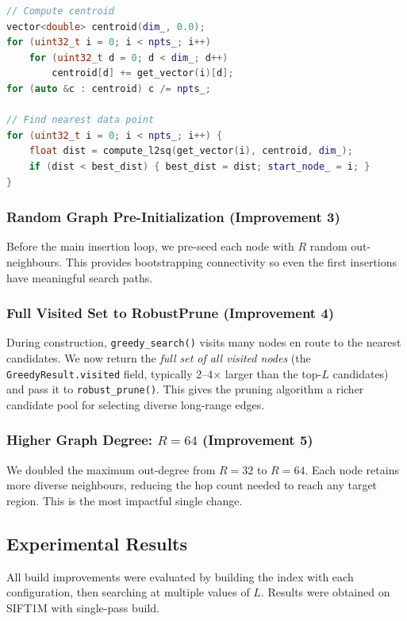 \documentclass[10pt]{article}
\begin{document}
\begin{lstlisting}[language=C++, caption={Medoid computation (simplified).}]
// Compute centroid
vector<double> centroid(dim_, 0.0);
for (uint32_t i = 0; i < npts_; i++)
    for (uint32_t d = 0; d < dim_; d++)
        centroid[d] += get_vector(i)[d];
for (auto &c : centroid) c /= npts_;

// Find nearest data point
for (uint32_t i = 0; i < npts_; i++) {
    float dist = compute_l2sq(get_vector(i), centroid, dim_);
    if (dist < best_dist) { best_dist = dist; start_node_ = i; }
}
\end{lstlisting}

\subsubsection{Random Graph Pre-Initialization (Improvement 3)}
Before the main insertion loop, we pre-seed each node with $R$ random out-neighbours. This provides bootstrapping connectivity so even the first insertions have meaningful search paths.

\subsubsection{Full Visited Set to RobustPrune (Improvement 4)}
During construction, \texttt{greedy\_search()} visits many nodes en route to the nearest candidates. We now return the \emph{full set of all visited nodes} (the \texttt{GreedyResult.visited} field, typically 2--4$\times$ larger than the top-$L$ candidates) and pass it to \texttt{robust\_prune()}. This gives the pruning algorithm a richer candidate pool for selecting diverse long-range edges.

\subsubsection{Higher Graph Degree: $R=64$ (Improvement 5)}
We doubled the maximum out-degree from $R=32$ to $R=64$. Each node retains more diverse neighbours, reducing the hop count needed to reach any target region. This is the most impactful single change.

\subsection{Experimental Results}

All build improvements were evaluated by building the index with each configuration, then searching at multiple values of $L$. Results were obtained on SIFT1M with single-pass build.
\end{document}
